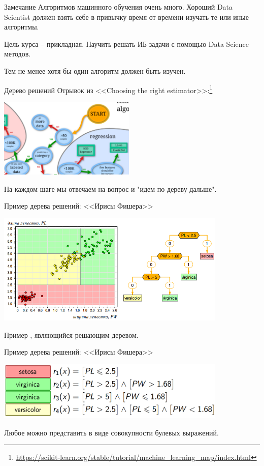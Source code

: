 \begin{frame}
\begin{block}{Замечание}
	Алгоритмов машинного обучения очень много. 
	Хороший Data Scientist должен взять себе в привычку
	время от времени изучать те или иные алгоритмы.
	
	Цель курса -- прикладная. Научить решать ИБ задачи с помощью
	Data Science методов.
	
	Тем не менее хотя бы один алгоритм должен быть изучен.
\end{block}
\end{frame}

\begin{frame}{Дерево решений}
	Отрывок из <<Choosing the right estimator>>:\footnote{\tiny \url{https://scikit-learn.org/stable/tutorial/machine_learning_map/index.html}}
	\begin{center}
	\includegraphics[width=6.5cm]{../pic/scikit_desicion_tree.png}\centering
	\end{center}
	На каждом шаге мы отвечаем на вопрос и "идем по дереву дальше".
\end{frame}

\begin{frame}{Пример дерева решений: <<Ирисы Фишера>>}
	\begin{center}
	\includegraphics[width=11cm]{../pic/fisher_iris_tree.png}
	\end{center}
	Пример , являющийся решающим деревом.
\end{frame}

\begin{frame}{Пример дерева решений: <<Ирисы Фишера>>}
	\begin{center}
	\includegraphics[width=11cm]{../pic/fisher_iris_boolean.png}
	\end{center}
	
	Любое  можно представить в виде совокупности
	булевых выражений.
\end{frame}

